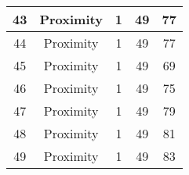 \documentclass[results.tex]{subfiles}
\begin{document}
\begin{center}
\begin{tabular}{| c || c | c | c | c |}
            \hline
            43                      & Proximity                    & 1                      & 49                      & 77                   \\
            \hline
            44                      & Proximity                    & 1                      & 49                      & 77                   \\
            \hline
            45                      & Proximity                    & 1                      & 49                      & 69                   \\
            \hline
            46                      & Proximity                    & 1                      & 49                      & 75                   \\
            \hline
            47                      & Proximity                    & 1                      & 49                      & 79                   \\
            \hline
            48                      & Proximity                    & 1                      & 49                      & 81                   \\
            \hline
            49                      & Proximity                    & 1                      & 49                      & 83                   \\
            \hline
        \end{tabular}
    \end{center}
\end{document}
